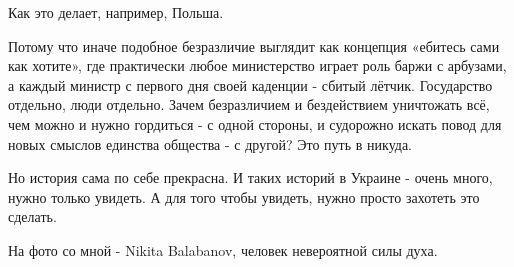 Как это делает, например, Польша.

Потому что иначе подобное безразличие выглядит как концепция «ебитесь сами как
хотите», где практически любое министерство играет роль баржи с арбузами, а
каждый министр с первого дня своей каденции - сбитый лётчик. Государство
отдельно, люди отдельно. Зачем безразличием и бездействием уничтожать всё, чем
можно и нужно гордиться - с одной стороны, и судорожно искать повод для новых
смыслов единства общества - с другой? Это путь в никуда.

Но история сама по себе прекрасна. И таких историй в Украине - очень много,
нужно только увидеть. А для того чтобы увидеть, нужно просто захотеть это
сделать. 

На фото со мной - Nikita  Balabanov, человек невероятной силы духа.
